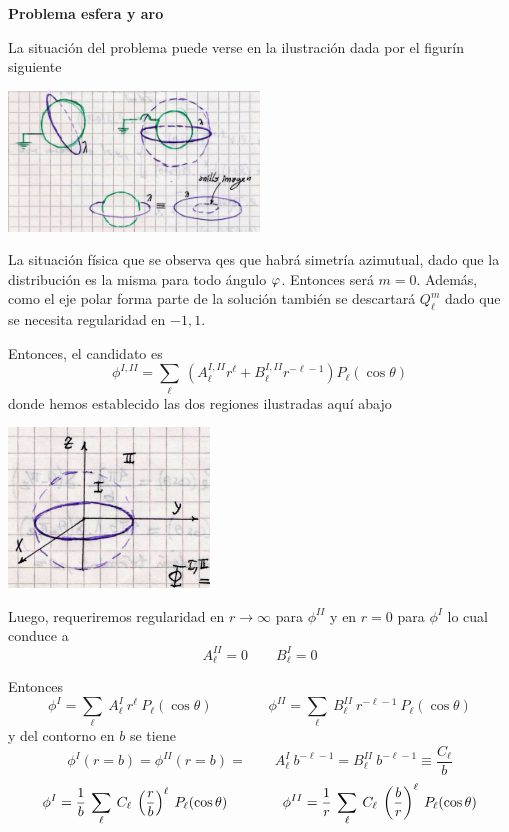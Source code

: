 \documentclass[10pt,oneside]{CBFT_book}
\begin{document}
\begin{ejemplo}{\bf Problema esfera y aro}

La situación del problema puede verse en la ilustración dada por el figurín siguiente

\includegraphics[width=0.5\textwidth]{images/fig_ft1_problema_esfera_anillada_A.jpg}

La situación física que se observa qes que habrá simetría azimutual, dado que la distribución
es la misma para todo ángulo $\varphi$. Entonces será $m=0$.
Además, como el eje polar forma parte de la solución también se descartará $Q^m_\ell$
dado que se necesita regularidad en $-1,1$.

Entonces, el candidato es
\[
	\phi^{I,II} = \sum_\ell \: ( A_\ell^{I,II} r^\ell + B_\ell^{I,II} r^{-\ell-1}) P_\ell(\cos\theta)
\]
donde hemos establecido las dos regiones ilustradas aquí abajo

\includegraphics[width=0.4\textwidth]{images/fig_ft1_problema_esfera_anillada_B.jpg}

Luego, requeriremos regularidad en $r \to \infty$ para $\phi^{II}$ y en $r=0$ para $\phi^{I}$
lo cual conduce a
\[
	A_\ell^{II} = 0 \qquad B_\ell^{I} = 0
\]

Entonces
\[
	\phi^{I} = \sum_\ell \: A^I_\ell \: r^\ell \: P_\ell(\cos\theta) \qquad \qquad 
	\phi^{II} = \sum_\ell \: B^{II}_\ell \: r^{-\ell-1} \: P_\ell(\cos\theta)
\]
y del contorno en $b$ se tiene
\[
	\phi^{I}(r=b) = \phi^{II}(r=b) = \qquad 
	A^{I}_\ell \: b^{-\ell-1} = B^{II}_\ell \: b^{-\ell-1} \equiv \frac{C_\ell}{b}
\]
\[
	\phi^{I} = \frac{1}{b} \: \sum_\ell \: C_\ell \: \left( \frac{ r }{ b } \right)^{\ell} \: P_\ell(\cos\theta) \qquad\qquad 
	\phi^{II} = \frac{1}{r} \: \sum_\ell \: C_\ell \: \left( \frac{ b }{ r } \right)^{\ell} \: P_\ell(\cos\theta)
\]


\end{ejemplo}
\end{document}

